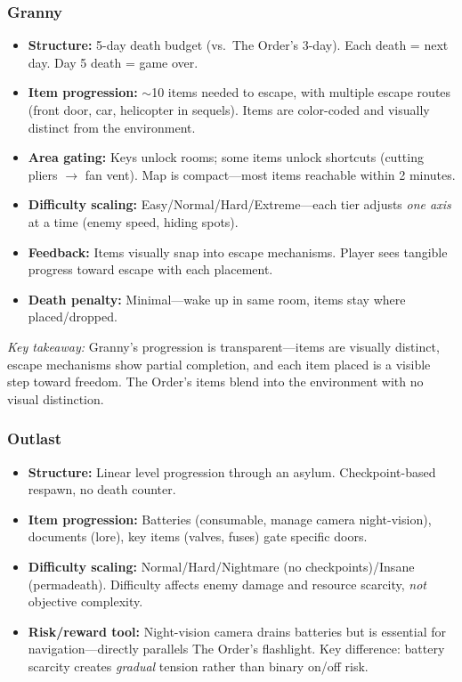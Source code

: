 \documentclass[11pt]{article}
\begin{document}
\subsubsection{Granny}
\begin{itemize}[nosep]
\item \textbf{Structure:} 5-day death budget (vs.\ The Order's 3-day). Each death = next day. Day 5 death = game over.
\item \textbf{Item progression:} $\sim$10 items needed to escape, with multiple escape routes (front door, car, helicopter in sequels). Items are color-coded and visually distinct from the environment.
\item \textbf{Area gating:} Keys unlock rooms; some items unlock shortcuts (cutting pliers $\to$ fan vent). Map is compact---most items reachable within 2 minutes.
\item \textbf{Difficulty scaling:} Easy/Normal/Hard/Extreme---each tier adjusts \textit{one axis} at a time (enemy speed, hiding spots).
\item \textbf{Feedback:} Items visually snap into escape mechanisms. Player sees tangible progress toward escape with each placement.
\item \textbf{Death penalty:} Minimal---wake up in same room, items stay where placed/dropped.
\end{itemize}

\textit{Key takeaway:} Granny's progression is transparent---items are visually distinct, escape mechanisms show partial completion, and each item placed is a visible step toward freedom. The Order's items blend into the environment with no visual distinction.

\subsubsection{Outlast}
\begin{itemize}[nosep]
\item \textbf{Structure:} Linear level progression through an asylum. Checkpoint-based respawn, no death counter.
\item \textbf{Item progression:} Batteries (consumable, manage camera night-vision), documents (lore), key items (valves, fuses) gate specific doors.
\item \textbf{Difficulty scaling:} Normal/Hard/Nightmare (no checkpoints)/Insane (permadeath). Difficulty affects enemy damage and resource scarcity, \textit{not} objective complexity.
\item \textbf{Risk/reward tool:} Night-vision camera drains batteries but is essential for navigation---directly parallels The Order's flashlight. Key difference: battery scarcity creates \textit{gradual} tension rather than binary on/off risk.
\end{itemize}
\end{document}
